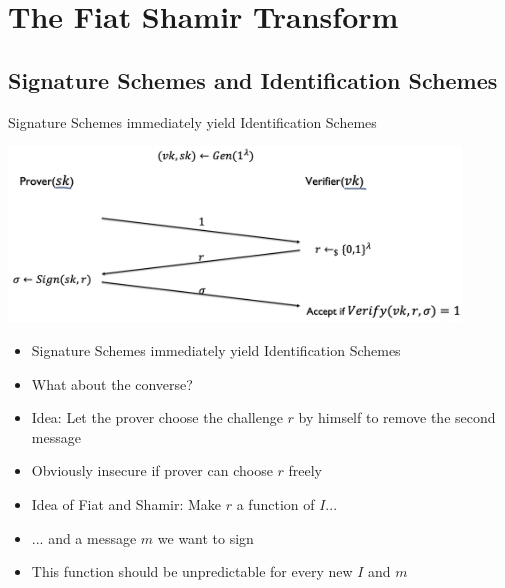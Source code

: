 

\chapter{The Fiat Shamir Transform}

\section{Signature Schemes and Identification Schemes}
    Signature Schemes immediately yield Identification Schemes
    \begin{center}
        \includegraphics[width=120mm]{Graphics/Digital Signatures/fst1.png}
    \end{center}
    \begin{itemize}
        \item Signature Schemes immediately yield Identification Schemes
        \item What about the converse?
        \item Idea: Let the prover choose the challenge $r$ by himself to remove the second message
        \item Obviously insecure if prover can choose $r$ freely
        \item Idea of Fiat and Shamir: Make $r$ a function of $I$...
        \item ... and a message $m$ we want to sign
        \item This function should be unpredictable for every new $I$ and $m$
    \end{itemize}

